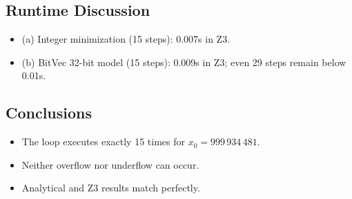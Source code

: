 \documentclass[a4paper,11pt]{article}
\begin{document}
\subsection*{Runtime Discussion}
\begin{itemize}
  \item (a) Integer minimization (15 steps): 0.007s in Z3.
  \item (b) BitVec 32-bit model (15 steps): 0.009s in Z3; even 29 steps remain below 0.01s.
\end{itemize}



\subsection*{Conclusions}
\begin{itemize}
\item The loop executes exactly 15 times for $x_0 = 999\,934\,481$.
\item Neither overflow nor underflow can occur.
\item Analytical and Z3 results match perfectly.
\end{itemize}
\end{document}

